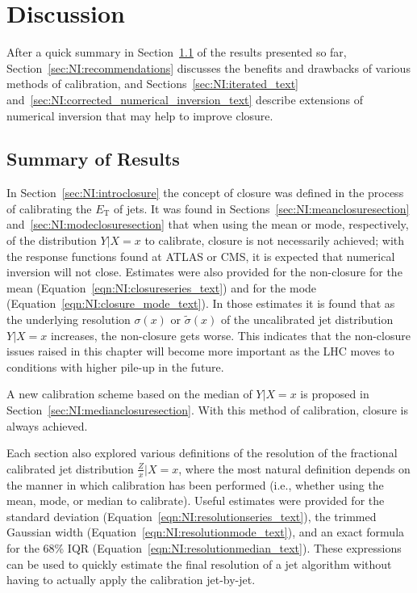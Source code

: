 \section{Discussion}
\label{sec:NI:discussion}

After a quick summary in Section~\ref{sec:NI:summary} of the results presented so far, Section~\ref{sec:NI:recommendations} discusses the benefits and drawbacks of various methods of calibration, and Sections~\ref{sec:NI:iterated_text} and~\ref{sec:NI:corrected_numerical_inversion_text} describe extensions of numerical inversion that may help to improve closure.

\subsection{Summary of Results}
\label{sec:NI:summary}
In Section~\ref{sec:NI:introclosure} the concept of closure was defined in the process of calibrating the $E_\text{T}$ of jets.
It was found in Sections~\ref{sec:NI:meanclosuresection} and~\ref{sec:NI:modeclosuresection} that when using the mean or mode, respectively, of the distribution $Y|X=x$ to calibrate, closure is not necessarily achieved; with the response functions found at ATLAS or CMS, it is expected that numerical inversion will not close.
Estimates were also provided for the non-closure for the mean (Equation~\ref{eqn:NI:closureseries_text}) and for the mode (Equation~\ref{eqn:NI:closure_mode_text}).
In those estimates it is found that as the underlying resolution $\sigma(x)$ or $\tilde{\sigma}(x)$ of the uncalibrated jet distribution $Y|X=x$ increases, the non-closure gets worse.
This indicates that the non-closure issues raised in this chapter will become more important as the LHC moves to conditions with higher pile-up in the future.

\vspace{2mm}

A new calibration scheme based on the median of $Y|X=x$ is proposed in Section~\ref{sec:NI:medianclosuresection}.
With this method of calibration, closure is always achieved.

\vspace{2mm}

Each section also explored various definitions of the resolution of the fractional calibrated jet distribution $\frac{Z}{x}|X=x$, where the most natural definition depends on the manner in which calibration has been performed (i.e., whether using the mean, mode, or median to calibrate).
Useful estimates were provided for the standard deviation (Equation~\ref{eqn:NI:resolutionseries_text}), the trimmed Gaussian width (Equation~\ref{eqn:NI:resolutionmode_text}), and an exact formula for the 68\% IQR (Equation~\ref{eqn:NI:resolutionmedian_text}).
These expressions can be used to quickly estimate the final resolution of a jet algorithm without having to actually apply the calibration jet-by-jet.

